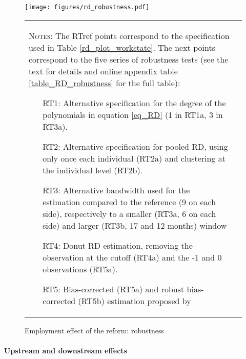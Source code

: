 \documentclass[12pt,a4paper]{article}
\begin{document}
\begin{figure}[!t] 
\caption{Employment effect of the reform: robustness}
\footnotesize
\label{fig_robustness}
\centering
\texttt{[image: figures/rd\_robustness.pdf]}
\vspace*{0.2cm}
\scriptsize
\begin{tabular}{ll}
\begin{minipage}{15cm}%
	\textsc{Notes:} The RTref points correspond to the specification used in Table \ref{rd_plot_workstate}. The next points correspond to the five series of robustness tests (see the text for details and online appendix table \ref{table_RD_robustness} for the full table):
	\begin{itemize}[label=-,leftmargin=1cm ,parsep=0cm,itemsep=0cm,topsep=0cm]
		\item[RT1:] Alternative specification for the degree of the polynomials in equation \ref{eq_RD} (1 in RT1a, 3 in RT3a).   
		\item[RT2:] Alternative specification for pooled RD, using only once each individual (RT2a) and clustering at the individual level (RT2b). 
		\item[RT3:] Alternative bandwidth used for the estimation compared to the reference (9 on each side), respectively to a smaller (RT3a, 6 on each side) and larger (RT3b, 17 and 12 months) window	
		\item[RT4:] Donut RD estimation, removing the observation at the cutoff (RT4a) and the -1 and 0 observations (RT5a). 
		\item[RT5:] Bias-corrected (RT5a) and robust bias-corrected (RT5b) estimation proposed by \cite{calonico2014robust}
	\end{itemize}
\end{minipage}%
\end{tabular}
\normalsize
\end{figure}

\paragraph{Upstream and downstream effects} 
\end{document}
